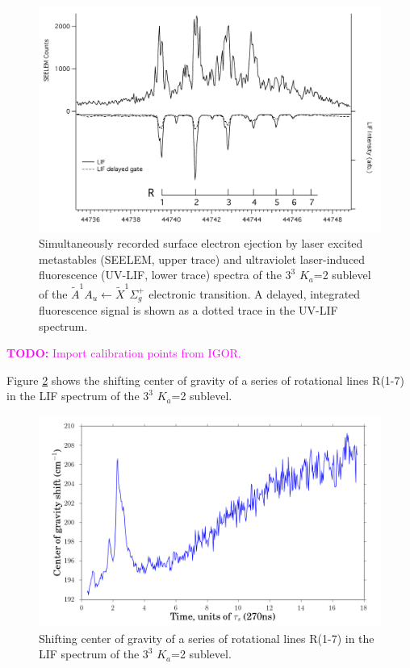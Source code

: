 \documentclass[12pt,draft]{mitthesis}
\newcommand{\TODO} [1]{\textcolor{magenta}{\textbf{TODO:} #1}}
\begin{document}
\begin{figure}
  \caption{
    Simultaneously recorded surface electron ejection by laser excited
    metastables (SEELEM, upper trace) and ultraviolet laser-induced
    fluorescence (UV-LIF, lower trace) spectra of the $3^3$ $K_a$=2
    sublevel of the $\tilde{A}^1A_u \leftarrow \tilde{X} ^1\Sigma_g^+$
    electronic transition. A delayed, integrated fluorescence signal
    is shown as a dotted trace in the UV-LIF spectrum.}
  \label{fig:spectrum-33k2}
  \centering
  \includegraphics[width=8in,angle=90]{spectrum-33k2.png}
\end{figure}

\TODO{Import calibration points from IGOR.}

Figure \ref{fig:33k2-cog-delay} shows the shifting center of gravity
of a series of rotational lines R(1-7) in the LIF spectrum of the
$3^3$ $K_a$=2 sublevel.

\begin{figure}
  \caption{Shifting center of gravity of a series of rotational lines
    R(1-7) in the LIF spectrum of the $3^3$ $K_a$=2 sublevel.}
  \label{fig:33k2-cog-delay}
  \centering
  \includegraphics[width=6in]{33k2-cog-delay.png}
\end{figure}
\end{document}
